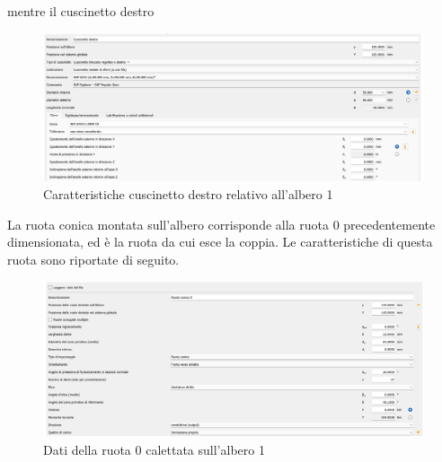 mentre il cuscinetto destro
\begin{figure}[h]
    \centering
    \includegraphics[scale=0.4]{Immagini/CuscinettoDestraAlbero1.png}
    \caption{Caratteristiche cuscinetto destro relativo all'albero 1}
    \label{fig:CuscinettoDestraAlbero1}
\end{figure}
\newpage
La ruota conica montata sull'albero corrisponde alla ruota 0 precedentemente dimensionata, ed è la ruota da cui esce la coppia. Le caratteristiche di questa ruota sono riportate di seguito.
\begin{figure}[h]
    \centering
    \includegraphics[scale=0.4]{Immagini/Ruota0Albero1.png}
    \caption{Dati della ruota 0 calettata sull'albero 1}
    \label{fig:Ruota0Albero1}
\end{figure}

